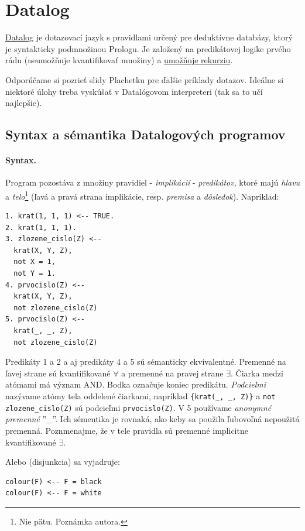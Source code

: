 \documentclass[10pt,a4paper]{article}
\begin{document}

\section{Datalog}
\href{http://en.wikipedia.org/wiki/Datalog}{Datalog} je dotazovací jazyk s pravidlami určený pre deduktívne databázy, ktorý je syntakticky podmnožinou Prologu. Je založený na predikátovej logike prvého rádu (neumožňuje kvantifikovať množiny) a \underline{umožňuje rekurziu}.

Odporúčame si pozrieť slidy Plachetku pre ďalšie príklady dotazov.
Ideálne si niektoré úlohy treba vyskúšať v Datalógovom interpreteri (tak sa to učí najlepšie).

\subsection{Syntax a sémantika Datalogových programov}

\paragraph{Syntax.}
Program pozostáva z množiny pravidiel - \emph{implikácií} - \emph{predikátov}, ktoré majú \emph{hlavu} a \emph{telo}\footnote{
Nie pätu. Poznámka autora.
} (ľavá a pravá strana implikácie, resp. \emph{premisa} a \emph{dôsledok}).
Napríklad:
\begin{verbatim}
1. krat(1, 1, 1) <-- TRUE.
2. krat(1, 1, 1).
3. zlozene_cislo(Z) <--
  krat(X, Y, Z),
  not X = 1,
  not Y = 1.
4. prvocislo(Z) <--
  krat(X, Y, Z),
  not zlozene_cislo(Z)
5. prvocislo(Z) <--
  krat(_, _, Z),
  not zlozene_cislo(Z)
\end{verbatim}
Predikáty 1 a 2 a aj predikáty 4 a 5 sú sémanticky ekvivalentné. Premenné
na ľavej strane sú kvantifikované $\forall$ a premenné na pravej strane
$\exists$. Čiarka medzi atómami má význam AND. Bodka označuje koniec
predikátu. \emph{Podcieľmi} nazývame atómy tela oddelené čiarkami, napríklad
  \verb|{krat(_, _, Z)}| a \verb|not zlozene_cislo(Z)| sú podcieľmi \verb|prvocislo(Z)|.
V 5 používame \emph{anonymné premenné} ''\_''. Ich sémentika je rovnaká, ako keby sa použila ľubovoľná nepoužitá premenná. Poznmenajme, že v tele pravidla sú premenné implicitne kvantifikované $\exists$.

Alebo (disjunkcia) sa vyjadruje:
\begin{verbatim}
colour(F) <-- F = black
colour(F) <-- F = white
\end{verbatim}
\end{document}
